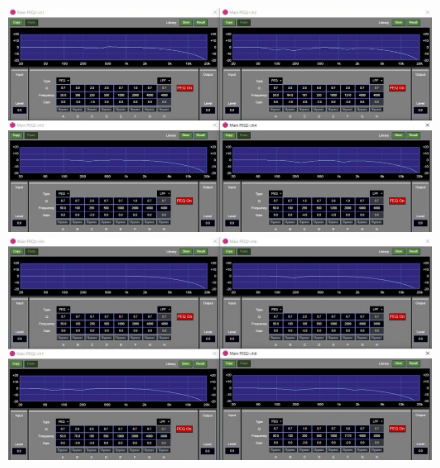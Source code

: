 \documentclass[11pt,a4j]{jreport}
\begin{document}
\begin{figure}[H]
  \begin{minipage}[b]{.5\linewidth}
    \centering
    \includegraphics[width=.9\linewidth]{images/experimentField/afcParameters/02beta/04manualEQ1.jpg}
  \end{minipage}%
  \begin{minipage}[b]{.5\linewidth}
    \centering
    \includegraphics[width=.9\linewidth]{images/experimentField/afcParameters/02beta/04manualEQ2.jpg}
  \end{minipage}


\end{figure}
\end{document}
